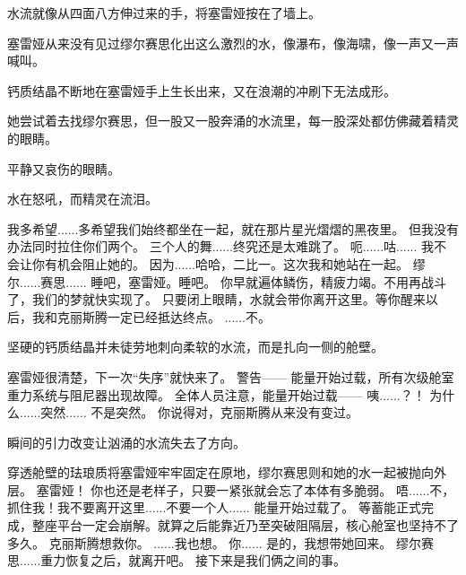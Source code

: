 \documentclass[openany]{book}
\begin{document}
水流就像从四面八方伸过来的手，将塞雷娅按在了墙上。\par
塞雷娅从来没有见过缪尔赛思化出这么激烈的水，像瀑布，像海啸，像一声又一声喊叫。\par
钙质结晶不断地在塞雷娅手上生长出来，又在浪潮的冲刷下无法成形。\par
她尝试着去找缪尔赛思，但一股又一股奔涌的水流里，每一股深处都仿佛藏着精灵的眼睛。\par
平静又哀伤的眼睛。\par
水在怒吼，而精灵在流泪。

\begin{dialogue}
     我多希望......多希望我们始终都坐在一起，就在那片星光熠熠的黑夜里。
     但我没有办法同时拉住你们两个。
     三个人的舞......终究还是太难跳了。
     呃......咕......
     我不会让你有机会阻止她的。
     因为......哈哈，二比一。这次我和她站在一起。
     缪尔......赛思......
     睡吧，塞雷娅。睡吧。
     你早就遍体鳞伤，精疲力竭。不用再战斗了，我们的梦就快实现了。
     只要闭上眼睛，水就会带你离开这里。等你醒来以后，我和克丽斯腾一定已经抵达终点。
     ......不。\par
    坚硬的钙质结晶并未徒劳地刺向柔软的水流，而是扎向一侧的舱壁。\par
    塞雷娅很清楚，下一次“失序”就快来了。
     警告——
     能量开始过载，所有次级舱室重力系统与阻尼器出现故障。
     全体人员注意，能量开始过载——
     咦......？！
     为什么......突然......
     不是突然。
     你说得对，克丽斯腾从来没有变过。\par
    瞬间的引力改变让汹涌的水流失去了方向。\par
    穿透舱壁的珐琅质将塞雷娅牢牢固定在原地，缪尔赛思则和她的水一起被抛向外层。
     塞雷娅！
     你也还是老样子，只要一紧张就会忘了本体有多脆弱。
     唔......不，抓住我！我不要离开这里......不要一个人......
     能量开始过载了。
     等蓄能正式完成，整座平台一定会崩解。就算之后能靠近乃至突破阻隔层，核心舱室也坚持不了多久。
     克丽斯腾想救你。
     ......我也想。
     你......
     是的，我想带她回来。
     缪尔赛思......重力恢复之后，就离开吧。
     接下来是我们俩之间的事。
    \begin{figure}[h]

\end{figure}
\end{dialogue}
\end{document}
